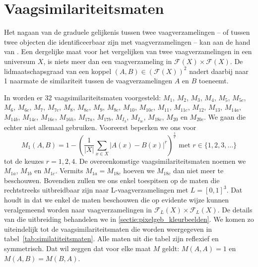 \section{Vaagsimilariteitsmaten}
\label{sectie:vaagsimilariteitsmaten}

Het nagaan van de graduele gelijkenis tussen twee vaagverzamelingen -- of tussen twee objecten die 
identificeerbaar zijn met vaagverzamelingen -- kan aan de hand van . 
Een dergelijke maat voor het vergelijken van twee vaagverzamelingen in een 
universum $X$, is niets meer dan een vaagverzameling in $\mathcal{F}(X) \times \mathcal{F}(X)$. De 
lidmaatschapsgraad van een koppel $(A,B) \in (\mathcal{F}(X))^2$ nadert daarbij naar 1 naarmate 
de similariteit tussen de vaagverzamelingen $A$ en $B$ toeneemt.

In \cite{vanderweken:similariteitsmaten} worden er 32 vaagsimilariteitsmaten voorgesteld: $M_1$, $M_2$,
$M_3$, $M_4$, $M_5$, $M_{5c}$, $M_6$, $M_{6c}$, $M_7$, $M_{7c}$, $M_8$, $M_{8c}$, $M_9$, $M_{9c}$,
$M_{10}$, $M_{10c}$, $M_{11}$, $M_{11c}$, $M_{12}$, $M_{13}$, $M_{14a}$, $M_{14b}$, $M_{14c}$, 
$M_{16e}$, $M_{16h}$, $M_{17a}$, $M_{17b}$, $M_{I_3}$, $M_{I_{3c}}$, $M_{18c}$, $M_{20}$ en $M_{20c}$.
We gaan die echter niet allemaal gebruiken. Vooreerst beperken we ons voor
$$
M_1(A,B) = 1 - \left(\frac{1}{|X|} \sum_{x \in X} | A(x) - B(x)|^r\right)^\frac{1}{r} \textrm{ met } 
r \in \{1,2,3,\ldots\}
$$ tot de keuzes
$r=1,2,4$. De overeenkomstige vaagsimilariteitsmaten noemen we $M_{1a}$, $M_{1b}$ en $M_{1c}$. Vermits
$M_{1a}=M_{18c}$ hoeven we $M_{18c}$ dan niet meer te beschouwen. 
Bovendien zullen we ons enkel
toespitsen op de maten die rechtstreeks uitbreidbaar zijn naar L-vaagverzamelingen met $L=[0,1]^3$. 
Dat houdt in dat we enkel de maten beschouwen die op evidente wijze kunnen veralgemeend worden naar
vaagverzamelingen in $\mathcal{F}_L(X) \times \mathcal{F}_L(X)$. De details van die
uitbreiding behandelen we in \ref{sectie:pixelgeb_kleurbeelden}. 
We komen zo uiteindelijk tot
de vaagsimilariteitsmaten die worden weergegeven in tabel~\ref{tab:similatiteitsmaten}. 
Alle maten uit die tabel zijn reflexief en symmetrisch. Dat wil zeggen dat 
voor elke maat $M$ geldt: $M(A,A)=1$ en $M(A,B)=M(B,A)$. 


